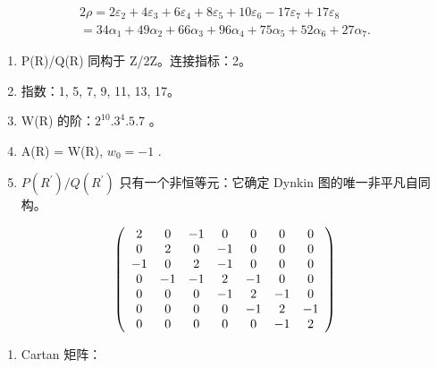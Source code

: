 \[
\begin{array}{l} 2 \rho = 2 \varepsilon_ {2} + 4 \varepsilon_ {3} + 6 \varepsilon_ {4} + 8 \varepsilon_ {5} + 10 \varepsilon_ {6} - 17 \varepsilon_ {7} + 17 \varepsilon_ {8} \\ = 34 \alpha_ {1} + 49 \alpha_ {2} + 66 \alpha_ {3} + 96 \alpha_ {4} + 75 \alpha_ {5} + 52 \alpha_ {6} + 27 \alpha_ {7}. \end{array}
\]


\begin{enumerate}
\def\labelenumi{(\Roman{enumi})}
\setcounter{enumi}{7}
\item
  P(R)/Q(R) 同构于 Z/2Z。连接指标：2。
\item
  指数：1, 5, 7, 9, 11, 13, 17。
\item
  W(R) 的阶：\(2^{10}.3^{4}.5.7\) 。
\item
  A(R) = W(R), \(w_{0} = -1\) .
\item
  \(P(R^{\prime})/Q(R^{\prime})\) 只有一个非恒等元：它确定 Dynkin 图的唯一非平凡自同构。
\end{enumerate}

\[
\left( \begin{array}{c c c c c c c} 2 & 0 & - 1 & 0 & 0 & 0 & 0 \\ 0 & 2 & 0 & - 1 & 0 & 0 & 0 \\ - 1 & 0 & 2 & - 1 & 0 & 0 & 0 \\ 0 & - 1 & - 1 & 2 & - 1 & 0 & 0 \\ 0 & 0 & 0 & - 1 & 2 & - 1 & 0 \\ 0 & 0 & 0 & 0 & - 1 & 2 & - 1 \\ 0 & 0 & 0 & 0 & 0 & - 1 & 2 \end{array} \right)
\]

\begin{enumerate}
\def\labelenumi{(\Roman{enumi})}
\setcounter{enumi}{12}
\tightlist
\item
  Cartan 矩阵：
\end{enumerate}

